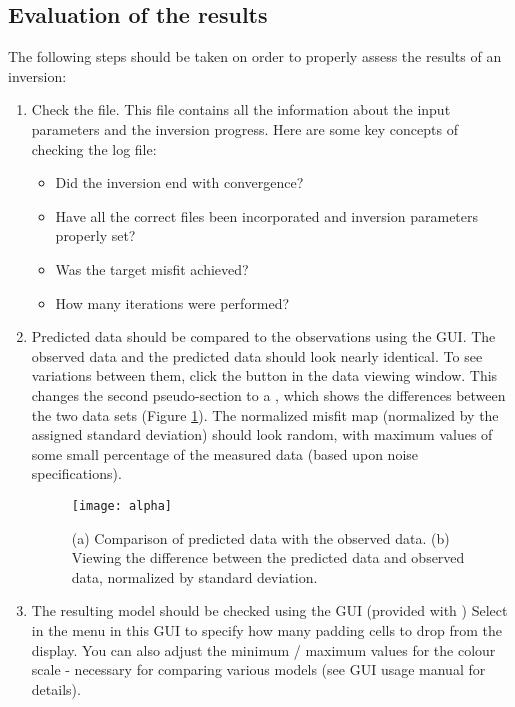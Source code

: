 \subsection{Evaluation of the results}
The following steps should be taken on order to properly assess the results of an inversion:
%
\begin{enumerate}
\item Check the  file. This file contains all the information about the input parameters and the inversion progress. Here are some key concepts of checking the log file:
%
\begin{itemize}
\item Did the inversion end with convergence?
\item Have all the correct files been incorporated and inversion parameters properly set?
\item Was the target misfit achieved?
\item How many iterations were performed?
\end{itemize}
%
\item Predicted data should be compared to the observations using the  GUI. The observed data and the predicted data should look nearly identical. To see variations between them, click the  button in the data viewing window. This changes the second pseudo-section to a , which shows the differences between the two data sets (Figure \ref{fig:misfit}). The normalized misfit map (normalized by the assigned standard deviation) should look random, with maximum values of some small percentage of the measured data (based upon noise specifications).
%
\begin{figure}
\centering
\texttt{[image: alpha]}
\caption{(a) Comparison of predicted data with the observed data. (b) Viewing the difference between the predicted data and observed data, normalized by standard deviation.}
\label{fig:misfit}
\end{figure}
%
\item The resulting model should be checked using the  GUI (provided with \prog) Select  in the  menu in this GUI to specify how many padding cells to drop from the display. You can also adjust the minimum / maximum values for the colour scale - necessary for comparing various models (see GUI usage manual for details).
%

\end{enumerate}
